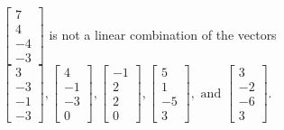 \begin{exercise}
\begin{exerciseStatement}
  \end{exerciseStatement}
  \begin{exerciseAnswer}
   \(\left[\begin{array}{c}
7 \\
4 \\
-4 \\
-3
\end{array}\right]\) 
  	 is not  
	a linear combination of the vectors \(\left[\begin{array}{c}
3 \\
-3 \\
-1 \\
-3
\end{array}\right] , \left[\begin{array}{c}
4 \\
-1 \\
-3 \\
0
\end{array}\right] , \left[\begin{array}{c}
-1 \\
2 \\
2 \\
0
\end{array}\right] , \left[\begin{array}{c}
5 \\
1 \\
-5 \\
3
\end{array}\right] , \text{ and } \left[\begin{array}{c}
3 \\
-2 \\
-6 \\
3
\end{array}\right]\).

	
  


  \end{exerciseAnswer}
\end{exercise}